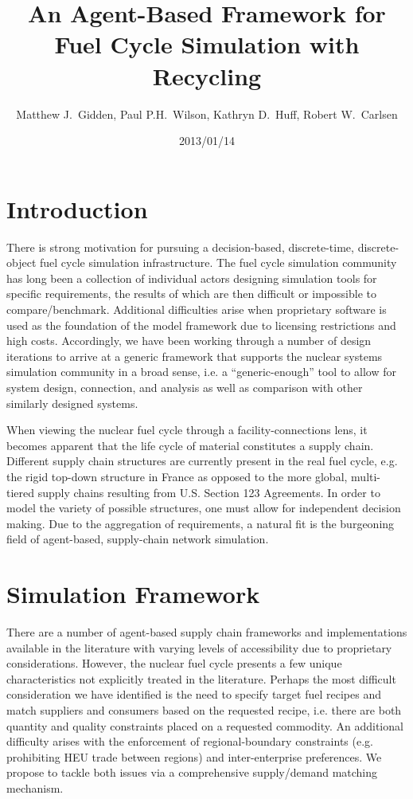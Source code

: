 \documentclass{anstrans}
\title{An Agent-Based Framework for Fuel Cycle Simulation with Recycling}
\author{Matthew J.~Gidden, Paul P.H.~Wilson, Kathryn D.~Huff, Robert W.~Carlsen}
\institute{Department of Nuclear Engineering \& Engineering Physics, University of Wisconsin - Madison, Madison, WI, 53703}
\date{2013/01/14}
\begin{document}
\section{Introduction}
There is strong motivation for pursuing a decision-based, 
discrete-time, discrete-object fuel cycle simulation infrastructure. 
The fuel cycle simulation community has long been a collection of 
individual actors designing simulation tools for specific 
requirements, the results of which are then difficult or impossible 
to compare/benchmark. Additional difficulties arise when proprietary 
software is used as the foundation of the model framework due to 
licensing restrictions and high costs. Accordingly, we have been 
working through a number of design iterations to arrive at a generic 
framework that supports the nuclear systems simulation community in a 
broad sense, i.e. a ``generic-enough'' tool to allow for system design, 
connection, and analysis as well as comparison with other similarly 
designed systems.

When viewing the nuclear fuel cycle through a facility-connections 
lens, it becomes apparent that the life cycle of material constitutes 
a supply chain. Different supply chain structures are currently 
present in the real fuel cycle, e.g. the rigid top-down structure in France 
as opposed to the more global, multi-tiered supply chains resulting 
from U.S. Section 123 Agreements. In order to model the variety of
possible structures, one must allow for independent decision making. 
Due to the aggregation of requirements, a natural fit is the 
burgeoning field of agent-based, supply-chain network simulation.

\section{Simulation Framework}
There are a number of agent-based supply chain frameworks and 
implementations available in the literature with varying levels of 
accessibility due to proprietary considerations.\cite{swaminathan_modeling_1998}\cite{julka_agent-based_2002}\cite{van_der_zee_modeling_2005}\cite{chatfield_multi-formalism_2007}
However, the nuclear fuel cycle presents a few unique characteristics not explicitly 
treated in the literature. Perhaps the most difficult consideration 
we have identified is the need to specify target fuel recipes and
match suppliers and consumers based on the requested recipe, i.e. 
there are both quantity and quality constraints placed on a requested 
commodity. An additional difficulty arises with the enforcement of 
regional-boundary constraints (e.g. prohibiting HEU trade between 
regions) and inter-enterprise preferences. We propose to tackle both 
issues via a comprehensive supply/demand matching mechanism.
\end{document}
